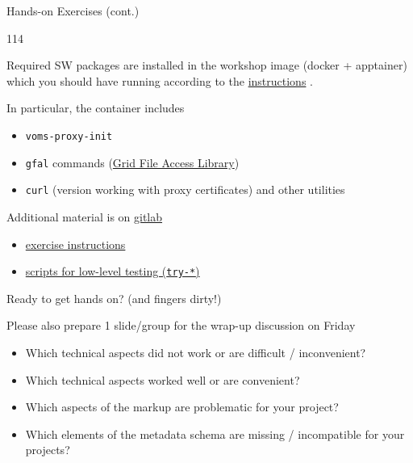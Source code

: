 \documentclass[aspectratio=169,xcolor=dvipsnames]{beamer}
\newcommand{\bi}{\begin{itemize}}
\newcommand{\ei}{\end{itemize}}
\begin{document}
\begin{frame}{Hands-on Exercises (cont.)}
  \begin{dinglist}{114}
  \item Required SW packages are installed in the workshop image (docker + apptainer)\\
    which you should have running according to the
    \href{https://gitlab.desy.de/ildg/hands-on/workshop-image/blob/main/README.md}{instructions} . \\
    {\small
      In particular, the container includes
      \bi
      \item {\tt voms-proxy-init}
      \item {\tt gfal} commands
        (\href{http://grid-deployment.web.cern.ch/grid-deployment/dms/dmc/docs/gfal2-2.10.2/}{Grid File Access Library})
      \item {\tt curl} (version working with proxy certificates) and other utilities
      \ei
    }
  \item Additional material is on \href{https://gitlab.desy.de/ildg/hands-on}{gitlab}
   \bi
   \item \href{https://gitlab.desy.de/ildg/hands-on/material.git}{exercise instructions}
   \item \href{https://gitlab.desy.de/ildg/hands-on/try-client.git}{scripts for low-level testing ({\tt try-*})}
   \ei
  \item Ready to get hands on? (and fingers dirty!)

  \item Please also prepare 1 slide/group for the wrap-up discussion on Friday \\
    {\small
      \bi
      \item Which technical aspects did not work or are difficult / inconvenient?
      \item Which technical aspects worked well or are convenient?
      \item Which aspects of the markup are problematic for your project?
      \item Which elements of the metadata schema are missing / incompatible for your projects?
   \ei
    }
  \end{dinglist}
  \vfill
\end{frame}
\end{document}
